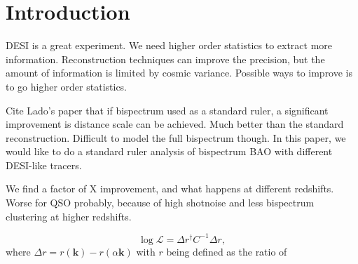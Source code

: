 \section{Introduction}
\label{sec:introduction}

DESI is a great experiment. We need higher order statistics to extract more information. Reconstruction techniques can improve the precision, but the amount of information is limited by cosmic variance. Possible ways to improve is to go higher order statistics. 

Cite Lado's paper that if bispectrum used as a standard ruler, a significant improvement is distance scale can be achieved. Much better than the standard reconstruction. Difficult to model the full bispectrum though. In this paper, we would like to do a standard ruler analysis of bispectrum BAO with different DESI-like tracers. 

We find a factor of X improvement, and what happens at different redshifts. Worse for QSO probably, because of high shotnoise and less bispectrum clustering at higher redshifts. 



\begin{equation}
\log \mathcal{L} = \Delta r^{\dagger} C^{-1} \Delta r,
\end{equation}
where $\Delta r = r(\textbf{k}) - r(\alpha \textbf{k})$ with $r$ being defined as the ratio of




